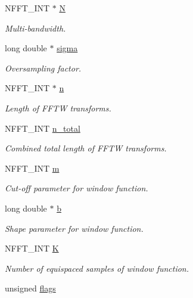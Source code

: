 \begin{DoxyCompactItemize}
N\-F\-F\-T\-\_\-\-I\-N\-T $\ast$ \hyperlink{structnfftl__plan_a4444859ed07357dd2694328980d49e82}{N}
\begin{DoxyCompactList}\small\item\em Multi-\/bandwidth. \end{DoxyCompactList}\item 
long double $\ast$ \hyperlink{structnfftl__plan_a149fdaed10fafdb3bf414110ad233b7c}{sigma}
\begin{DoxyCompactList}\small\item\em Oversampling factor. \end{DoxyCompactList}\item 
N\-F\-F\-T\-\_\-\-I\-N\-T $\ast$ \hyperlink{structnfftl__plan_af0a743414fedce17f278084b97110dfb}{n}
\begin{DoxyCompactList}\small\item\em Length of F\-F\-T\-W transforms. \end{DoxyCompactList}\item 
N\-F\-F\-T\-\_\-\-I\-N\-T \hyperlink{structnfftl__plan_afbc61ba78ca220fc8d6c72624772f991}{n\-\_\-total}
\begin{DoxyCompactList}\small\item\em Combined total length of F\-F\-T\-W transforms. \end{DoxyCompactList}\item 
N\-F\-F\-T\-\_\-\-I\-N\-T \hyperlink{structnfftl__plan_aadaf25d2fd1158123136469a264a6a5b}{m}
\begin{DoxyCompactList}\small\item\em Cut-\/off parameter for window function. \end{DoxyCompactList}\item 
\hypertarget{structnfftl__plan_a80c548cbcc4defbac2b544602a5baa85}{long double $\ast$ \hyperlink{structnfftl__plan_a80c548cbcc4defbac2b544602a5baa85}{b}}\label{structnfftl__plan_a80c548cbcc4defbac2b544602a5baa85}

\begin{DoxyCompactList}\small\item\em Shape parameter for window function. \end{DoxyCompactList}\item 
N\-F\-F\-T\-\_\-\-I\-N\-T \hyperlink{structnfftl__plan_acffbae62b14acf89ee913a5deace8bc9}{K}
\begin{DoxyCompactList}\small\item\em Number of equispaced samples of window function. \end{DoxyCompactList}\item 
\hypertarget{structnfftl__plan_ae56d75cf61e86559c60b8b85ad4e56c7}{unsigned \hyperlink{structnfftl__plan_ae56d75cf61e86559c60b8b85ad4e56c7}{flags}}\label{structnfftl__plan_ae56d75cf61e86559c60b8b85ad4e56c7}


\end{DoxyCompactItemize}
